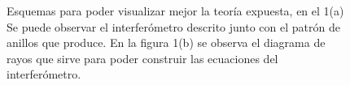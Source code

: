 \documentclass[DIV=calc, paper=a4, fontsize=10.5pt]{scrartcl}
\begin{document}
\begin{figure}
 \centering
    \caption{Esquemas para poder visualizar mejor la teoría expuesta, en el 1(a) Se puede observar el interferómetro descrito junto con el patrón de anillos que produce. En la figura 1(b) se observa el diagrama de rayos que sirve para poder construir las ecuaciones del interferómetro.}
 \label{f:animales}
\end{figure}
\end{document}
